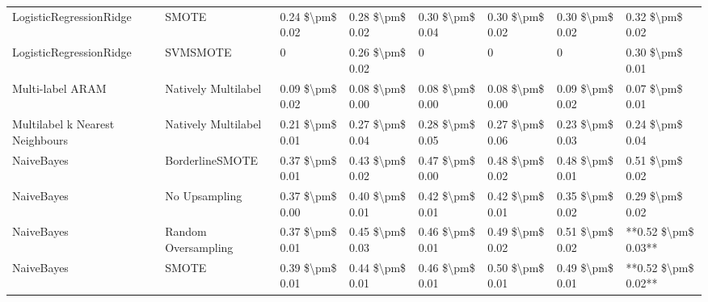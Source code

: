 \begin{tabular}{llllllll}
        LogisticRegressionRidge &                         SMOTE & 0.24 \$\textbackslash pm\$ 0.02 &           0.28 \$\textbackslash pm\$ 0.02 &       0.30 \$\textbackslash pm\$ 0.04 &        0.30 \$\textbackslash pm\$ 0.02 &                         0.30 \$\textbackslash pm\$ 0.02 &     0.32 \$\textbackslash pm\$ 0.02 \\
        LogisticRegressionRidge &                      SVMSMOTE &               0 &           0.26 \$\textbackslash pm\$ 0.02 &                     0 &                      0 &                                       0 &     0.30 \$\textbackslash pm\$ 0.01 \\
               Multi-label ARAM &           Natively Multilabel & 0.09 \$\textbackslash pm\$ 0.02 &           0.08 \$\textbackslash pm\$ 0.00 &       0.08 \$\textbackslash pm\$ 0.00 &        0.08 \$\textbackslash pm\$ 0.00 &                         0.09 \$\textbackslash pm\$ 0.02 &     0.07 \$\textbackslash pm\$ 0.01 \\
Multilabel k Nearest Neighbours &           Natively Multilabel & 0.21 \$\textbackslash pm\$ 0.01 &           0.27 \$\textbackslash pm\$ 0.04 &       0.28 \$\textbackslash pm\$ 0.05 &        0.27 \$\textbackslash pm\$ 0.06 &                         0.23 \$\textbackslash pm\$ 0.03 &     0.24 \$\textbackslash pm\$ 0.04 \\
                     NaiveBayes &               BorderlineSMOTE & 0.37 \$\textbackslash pm\$ 0.01 &           0.43 \$\textbackslash pm\$ 0.02 &       0.47 \$\textbackslash pm\$ 0.00 &        0.48 \$\textbackslash pm\$ 0.02 &                         0.48 \$\textbackslash pm\$ 0.01 &     0.51 \$\textbackslash pm\$ 0.02 \\
                     NaiveBayes &                 No Upsampling & 0.37 \$\textbackslash pm\$ 0.00 &           0.40 \$\textbackslash pm\$ 0.01 &       0.42 \$\textbackslash pm\$ 0.01 &        0.42 \$\textbackslash pm\$ 0.01 &                         0.35 \$\textbackslash pm\$ 0.02 &     0.29 \$\textbackslash pm\$ 0.02 \\
                     NaiveBayes &           Random Oversampling & 0.37 \$\textbackslash pm\$ 0.01 &           0.45 \$\textbackslash pm\$ 0.03 &       0.46 \$\textbackslash pm\$ 0.01 &        0.49 \$\textbackslash pm\$ 0.02 &                         0.51 \$\textbackslash pm\$ 0.02 & **0.52 \$\textbackslash pm\$ 0.03** \\
                     NaiveBayes &                         SMOTE & 0.39 \$\textbackslash pm\$ 0.01 &           0.44 \$\textbackslash pm\$ 0.01 &       0.46 \$\textbackslash pm\$ 0.01 &        0.50 \$\textbackslash pm\$ 0.01 &                         0.49 \$\textbackslash pm\$ 0.01 & **0.52 \$\textbackslash pm\$ 0.02** \\

\end{tabular}
